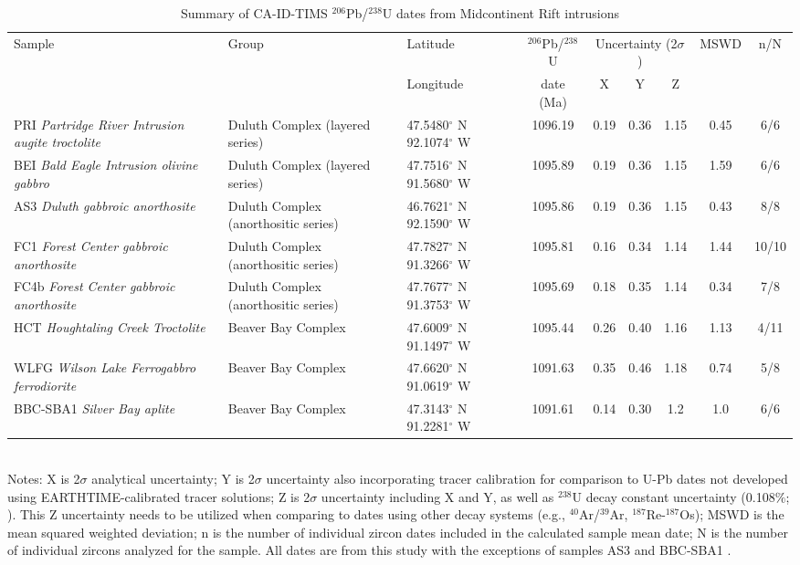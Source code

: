 \documentclass[11pt,letterpaper]{article}
\begin{document}
\begin{table}[h!]
\footnotesize
\caption{Summary of CA-ID-TIMS $^{206}$Pb/$^{238}$U dates from Midcontinent Rift intrusions}
\begin{tabular}{|p{3.2 cm}|p{2.4 cm}|p{1.8 cm}|c|ccc|c|c|}
\hline
Sample & Group & Latitude & $^{206}$Pb/$^{238}$U & \multicolumn{3}{|c|}{Uncertainty (2$\sigma$)} & MSWD & n/N \\
 &  & Longitude & date (Ma) & X & Y & Z & & \\
\hline
PRI \textit{Partridge River Intrusion augite troctolite} & Duluth Complex (layered series) & 47.5480$^{\circ}$ N 92.1074$^{\circ}$ W & 1096.19 & 0.19 & 0.36 & 1.15 & 0.45 & 6/6 \\
\hline
BEI \textit{Bald Eagle Intrusion olivine gabbro} & Duluth Complex (layered series) & 47.7516$^{\circ}$ N 91.5680$^{\circ}$ W & 1095.89 & 0.19 & 0.36 & 1.15 & 1.59 & 6/6 \\
\hline
AS3 \textit{Duluth gabbroic anorthosite} & Duluth Complex (anorthositic series) & 46.7621$^{\circ}$ N 92.1590$^{\circ}$ W & 1095.86 & 0.19 & 0.36 & 1.15 & 0.43 & 8/8 \\
\hline
FC1 \textit{Forest Center gabbroic anorthosite} & Duluth Complex (anorthositic series) & 47.7827$^{\circ}$ N 91.3266$^{\circ}$ W & 1095.81 & 0.16 & 0.34 & 1.14 & 1.44 & 10/10 \\
\hline
FC4b \textit{Forest Center gabbroic anorthosite} & Duluth Complex (anorthositic series) & 47.7677$^{\circ}$ N 91.3753$^{\circ}$ W & 1095.69 & 0.18 & 0.35 & 1.14 & 0.34 & 7/8 \\
\hline
HCT \textit{Houghtaling Creek Troctolite} & Beaver Bay Complex & 47.6009$^{\circ}$ N 91.1497$^{\circ}$ W & 1095.44 & 0.26 & 0.40 & 1.16 & 1.13 & 4/11  \\
\hline
WLFG \textit{Wilson Lake Ferrogabbro ferrodiorite} & Beaver Bay Complex & 47.6620$^{\circ}$ N 91.0619$^{\circ}$ W & 1091.63 & 0.35 & 0.46 & 1.18 & 0.74 & 5/8 \\
\hline
BBC-SBA1 \textit{Silver Bay aplite} & Beaver Bay Complex & 47.3143$^{\circ}$ N 91.2281$^{\circ}$ W & 1091.61 & 0.14 & 0.30 & 1.2 & 1.0 & 6/6 \\
\hline
\end{tabular}\\
Notes: X is 2$\sigma$ analytical uncertainty; Y is 2$\sigma$ uncertainty also incorporating tracer calibration for comparison to U-Pb dates not developed using EARTHTIME-calibrated tracer solutions; Z is 2$\sigma$ uncertainty including X and Y, as well as $^{238}$U decay constant uncertainty (0.108$\%$; \citealp{Jaffey1971a}). This Z uncertainty needs to be utilized when comparing to dates using other decay systems (e.g., $^{40}$Ar/$^{39}$Ar, $^{187}$Re-$^{187}$Os); MSWD is the mean squared weighted deviation; n is the number of individual zircon dates included in the calculated sample mean date; N is the number of individual zircons analyzed for the sample. All dates are from this study with the exceptions of samples AS3 \citep{Schoene2006a} and BBC-SBA1 \citep{Fairchild2017a}.
\label{tab:geochron}
\end{table}
\end{document}
